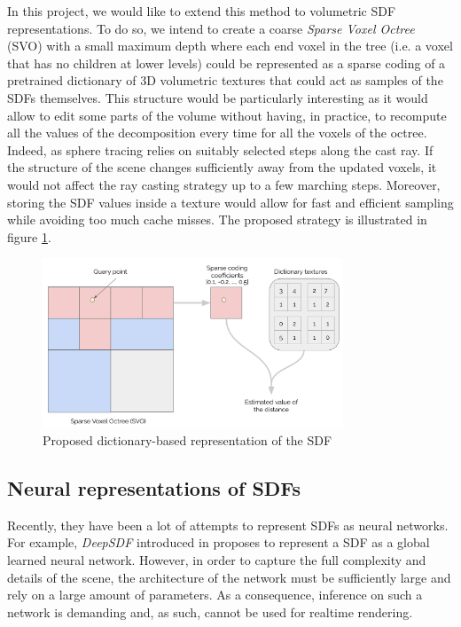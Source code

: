 \documentclass[10pt,a4paper,english, twocolumn]{article}
\begin{document}
In this project, we would like to extend this method to volumetric SDF representations. To do so, we intend to create a coarse \textit{Sparse Voxel Octree} (SVO) with a small maximum depth where each end voxel in the tree (i.e. a voxel that has no children at lower levels) could be represented as a sparse coding of a pretrained dictionary of 3D volumetric textures that could act as samples of the SDFs themselves. This structure would be particularly interesting as it would allow to edit some parts of the volume without having, in practice, to recompute all the values of the decomposition every time for all the voxels of the octree. Indeed, as sphere tracing relies on suitably selected steps along the cast ray. If the structure of the scene changes sufficiently away from the updated voxels, it would not affect the ray casting strategy up to a few marching steps. Moreover, storing the SDF values inside a texture would allow for fast and efficient sampling while avoiding too much cache misses. The proposed strategy is illustrated in figure \ref{fig:sparse-coding-sdf}.

\begin{figure}[h]
    \centering
    \includegraphics[width=0.8\textwidth]{figures/sparse-coding-sdf.png}
    \caption{Proposed dictionary-based representation of the SDF}
    \label{fig:sparse-coding-sdf}
\end{figure}

\subsection{Neural representations of SDFs}
\label{ssec:neural-sdf}
Recently, they have been a lot of attempts to represent SDFs as neural networks. For example, \textit{DeepSDF} introduced in \cite{Park_2019_CVPR} proposes to represent a SDF as a global learned neural network. However, in order to capture the full complexity and details of the scene, the architecture of the network must be sufficiently large and rely on a large amount of parameters. As a consequence, inference on such a network is demanding and, as such, cannot be used for realtime rendering.
\end{document}
